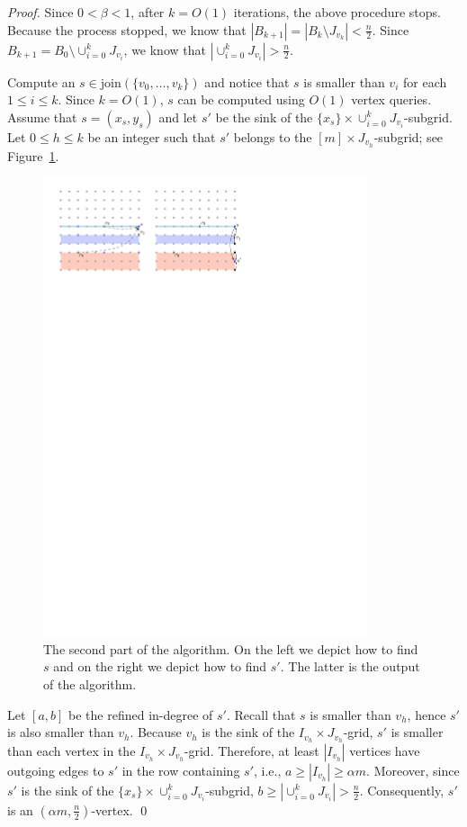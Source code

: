 \documentclass[runningheads,a4paper]{llncs}
\newcommand{\indegree}{refined in-degree\xspace}
\newcommand{\join}{\mbox{join}\xspace}
\begin{document}
\begin{proof}
Since $0 < \beta < 1$, after $k = O(1)$ iterations, the above procedure stops. 
Because the process stopped, we know that $|B_{k+1}| = |B_k \setminus J_{v_k}| <  \frac{n}{2}$.
Since $B_{k+1} = B_0\setminus \cup_{i=0}^k J_{v_i}$, we know that $|\cup_{i=0}^k J_{v_i}| >  \frac{n}{2}$.

Compute an $s \in \join(\{v_0, \ldots, v_k\})$ and notice that $s$ is smaller than $v_i$ for each $1\leq i\leq k$. Since $k = O(1)$, $s$ can be computed using $O(1)$ vertex queries. 
Assume that $s = (x_s, y_s)$ and let $s'$ be the sink of the $\{x_s\}\times \cup_{i=0}^k J_{v_i}$-subgrid. 
Let $0\leq h\leq k$ be an integer such that $s'$ belongs to the $[m]\times J_{v_h}$-subgrid; see Figure~\ref{fig:Climbing Lemma-2}.

\begin{figure}[h]
\centering
\includegraphics[width=0.85\textwidth]{ClimbingLemma-2.pdf}
\caption{\small The second part of the algorithm. On the left we depict how to find $s$ and on the right we depict how to find $s'$. The latter is the output of the algorithm.}
\label{fig:Climbing Lemma-2}
\end{figure}

Let $[a,b]$ be the \indegree of $s'$.
Recall that $s$ is smaller than $v_h$, hence $s'$ is also smaller than $v_h$.
Because $v_h$ is the sink of the $I_{v_h}\times J_{v_h}$-grid, $s'$ is smaller than each vertex in the $I_{v_h}\times J_{v_h}$-grid.
Therefore, at least $|I_{v_h}|$ vertices have outgoing edges to $s'$ in the row containing $s'$, i.e., $a\geq |I_{v_h}| \geq \alpha m$.
Moreover, since $s'$ is the sink of the $\{x_s\}\times \cup_{i=0}^k J_{v_i}$-subgrid, $b \geq |\cup_{i=0}^k J_{v_i}|  >  \frac{n}{2}$.
Consequently, $s'$ is an $(\alpha m,  \frac{n}{2})$-vertex. \qed
\end{proof}
\end{document}
